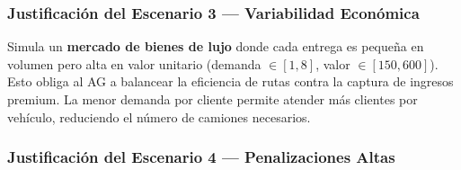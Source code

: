 \documentclass[12pt,letterpaper]{article}
\begin{document}
\begin{table}[H]
\centering
\caption{Configuración de los 5 escenarios experimentales.}
\label{tab:scenarios}
\renewcommand{\arraystretch}{1.3}
\end{table}

\subsubsection{Justificación del Escenario 3 — Variabilidad Económica}

\begin{yellowbox}
Simula un \textbf{mercado de bienes de lujo} donde cada entrega es pequeña en volumen pero alta en valor unitario (demanda $\in [1,8]$, valor $\in [150,600]$). Esto obliga al AG a balancear la eficiencia de rutas contra la captura de ingresos premium. La menor demanda por cliente permite atender más clientes por vehículo, reduciendo el número de camiones necesarios.
\end{yellowbox}

\subsubsection{Justificación del Escenario 4 — Penalizaciones Altas}
\end{document}
